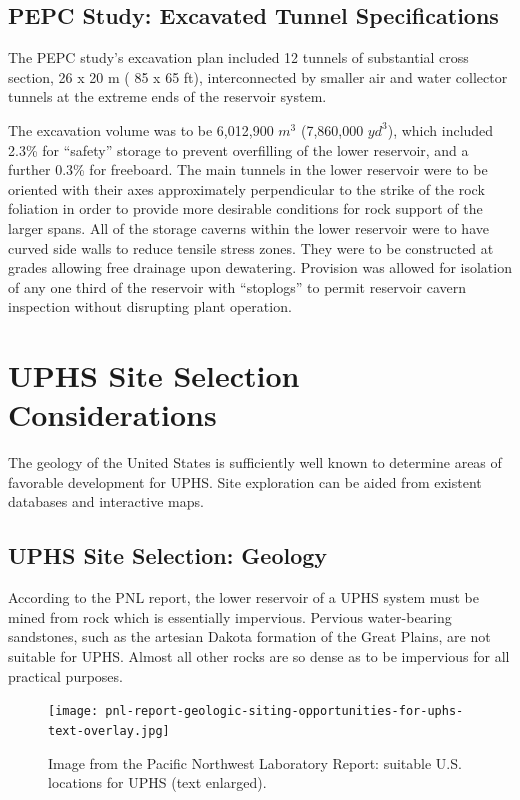 \documentclass[hidelinks,12pt,a4paper]{article}
\begin{document}
\subsection{PEPC Study: Excavated Tunnel Specifications}
The PEPC study's excavation plan included 12 tunnels of substantial cross section, 26 x 20 m ( 85 x 65 ft), interconnected by smaller air and water collector tunnels at the extreme ends of the reservoir system.

The excavation volume was to be 6,012,900 $m^3$ (7,860,000 $yd^3$), which included 2.3\% for “safety” storage to prevent overfilling of the lower reservoir, and a further 0.3\% for freeboard. The main tunnels in the lower reservoir were to be oriented with their axes approximately perpendicular to the strike of the rock foliation in order to provide more desirable conditions for rock support of the larger spans. All of the storage caverns within the lower reservoir were to have curved side walls to reduce tensile stress zones. They were to be constructed at grades allowing free drainage upon dewatering. Provision was allowed for isolation of any one third of the reservoir with “stoplogs” to permit reservoir cavern inspection without disrupting plant operation.

\pagebreak[4]
\section{UPHS Site Selection Considerations}
The geology of the United States is sufficiently well known to determine areas of favorable development for UPHS. Site exploration can be aided from existent databases and interactive maps.

\subsection{UPHS Site Selection: Geology}
According to the PNL report, the lower reservoir of a UPHS system must be mined from rock which is essentially impervious. Pervious water-bearing sandstones, such as the artesian Dakota formation of the Great Plains, are not suitable for UPHS. Almost all other rocks are so dense as to be impervious for all practical purposes. \cite{UndergroundPumpedHydroelectricStorage}

\begin{figure}[ht!]
    \centering
    \texttt{[image: pnl-report-geologic-siting-opportunities-for-uphs-text-overlay.jpg]}
    \caption{Image from the Pacific Northwest Laboratory Report: suitable U.S. locations for UPHS (text enlarged). \cite{UndergroundPumpedHydroelectricStorage}}
\end{figure}
\FloatBarrier
\end{document}
